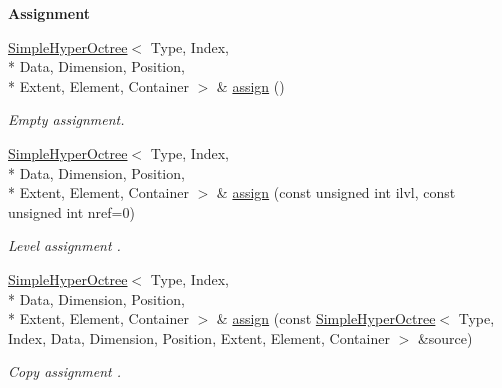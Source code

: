 \begin{Indent}{\bf Assignment}\par
\begin{DoxyCompactItemize}
\item 
\hyperlink{exceptionmagrathea_1_1SimpleHyperOctree}{Simple\-Hyper\-Octree}$<$ Type, Index, \\*
Data, Dimension, Position, \\*
Extent, Element, Container $>$ \& \hyperlink{exceptionmagrathea_1_1SimpleHyperOctree_aa99a071b51d94bf216f76631ad7cfdff}{assign} ()
\begin{DoxyCompactList}\small\item\em Empty assignment. \end{DoxyCompactList}\item 
\hyperlink{exceptionmagrathea_1_1SimpleHyperOctree}{Simple\-Hyper\-Octree}$<$ Type, Index, \\*
Data, Dimension, Position, \\*
Extent, Element, Container $>$ \& \hyperlink{exceptionmagrathea_1_1SimpleHyperOctree_a6ceffc4e7bade3b767fcdcfc880a91ee}{assign} (const unsigned int ilvl, const unsigned int nref=0)
\begin{DoxyCompactList}\small\item\em Level assignment . \end{DoxyCompactList}\item 
\hyperlink{exceptionmagrathea_1_1SimpleHyperOctree}{Simple\-Hyper\-Octree}$<$ Type, Index, \\*
Data, Dimension, Position, \\*
Extent, Element, Container $>$ \& \hyperlink{exceptionmagrathea_1_1SimpleHyperOctree_a6f47eaa173fd21cb6c6543e5ea894c26}{assign} (const \hyperlink{exceptionmagrathea_1_1SimpleHyperOctree}{Simple\-Hyper\-Octree}$<$ Type, Index, Data, Dimension, Position, Extent, Element, Container $>$ \&source)
\begin{DoxyCompactList}\small\item\em Copy assignment . \end{DoxyCompactList}\end{DoxyCompactItemize}
\end{Indent}
